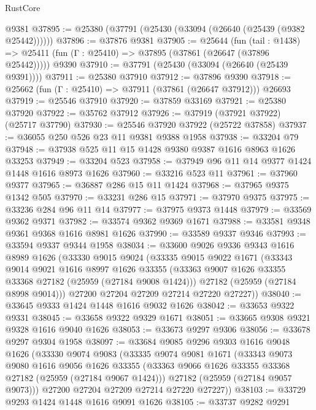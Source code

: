\begin{lexlean}{RustCore}
\begin{coremodule}
    @9381
@37895 := @25380 (@37791 (@25430 (@33094 (@26640 (@25439 (@9382 @25442))))))
@37896 := @37876 @9381
@37905 := @25644
    (fun (tail : @1438) => @25411 (fun (Γ : @25410) => @37895 (@37861 (@26647 (@37896 @25442)))))
    @9390
@37910 := @37791 (@25430 (@33094 (@26640 (@25439 @9391))))
@37911 := @25380 @37910
@37912 := @37896 @9390
@37918 := @25662 (fun (Γ : @25410) => @37911 (@37861 (@26647 @37912))) @26693
@37919 := @25546 @37910
@37920 := @37859 @33169
@37921 := @25380 @37920
@37922 := @35762 @37912
@37926 := @37919 (@37921 @37922) (@25717 @37790)
@37930 := @25546 @37920 @37922 (@25722 @37858)
@37937 := @36055 @250 @526 @23 @11 @9381 @9388 @1958
@37938 := @33204 @79
@37948 := @37938 @525 @11 @15 @1428 @9380 @9387 @1616 @8963 @1626 @33253
@37949 := @33204 @523
@37958 := @37949 @96 @11 @14 @9377 @1424 @1448 @1616 @8973 @1626
@37960 := @33216 @523 @11
@37961 := @37960 @9377
@37965 := @36887 @286 @15 @11 @1424
@37968 := @37965 @9375 @1342 @505
@37970 := @33231 @286 @15
@37971 := @37970 @9375
@37975 := @33236 @284 @96 @11 @14
@37977 := @37975 @9373 @1448
@37979 := @33569 @9362 @9371
@37982 := @33574 @9362 @9369 @1671
@37988 := @33581 @9348 @9361 @9368 @1616 @8981 @1626
@37990 := @33589 @9337 @9346
@37993 := @33594 @9337 @9344 @1958
@38034 := @33600
    @9026
    @9336
    @9343
    @1616
    @8989
    @1626
    (@33330
      @9015
      @9024
      (@33335
        @9015
        @9022
        @1671
        (@33343
          @9014
          @9021
          @1616
          @8997
          @1626
          @33355
          (@33363 @9007 @1626 @33355 @33368 @27182 (@25959 (@27184 @9008 @1424)))
          @27182
          (@25959 (@27184 @8998 @9014)))
        @27200
        @27204
        @27209
        @27214
        @27220
        @27227))
@38040 := @33645 @9333 @1424 @1448 @1616 @9032 @1626
@38042 := @33653 @9322 @9331
@38045 := @33658 @9322 @9329 @1671
@38051 := @33665 @9308 @9321 @9328 @1616 @9040 @1626
@38053 := @33673 @9297 @9306
@38056 := @33678 @9297 @9304 @1958
@38097 := @33684
    @9085
    @9296
    @9303
    @1616
    @9048
    @1626
    (@33330
      @9074
      @9083
      (@33335
        @9074
        @9081
        @1671
        (@33343
          @9073
          @9080
          @1616
          @9056
          @1626
          @33355
          (@33363 @9066 @1626 @33355 @33368 @27182 (@25959 (@27184 @9067 @1424)))
          @27182
          (@25959 (@27184 @9057 @9073)))
        @27200
        @27204
        @27209
        @27214
        @27220
        @27227))
@38103 := @33729 @9293 @1424 @1448 @1616 @9091 @1626
@38105 := @33737 @9282 @9291

\end{coremodule}
\end{lexlean}
